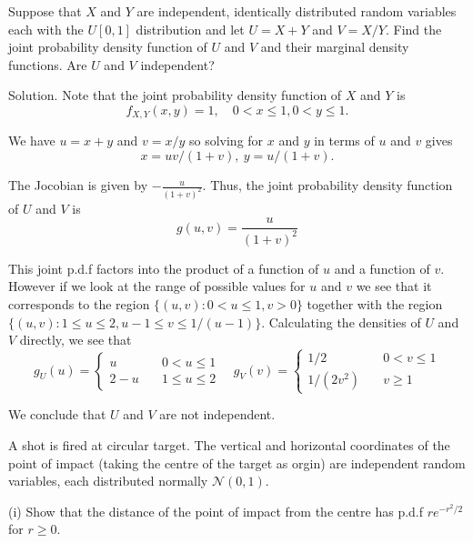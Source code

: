 \item Suppose that $X$ and $Y$ are independent, identically distributed random variables each with the $U[0,1]$ distribution and let $U=X+Y$ and $V=X/Y$. Find the joint probability density function of $U$ and $V$ and their marginal density functions. Are $U$ and $V$ independent?



Solution. Note that the joint probability density function of $X$ and $Y$ is 
\begin{equation}
f_{X,Y}(x,y) = 1,\quad 0<x\leq 1,0<y\leq 1.
\end{equation}

We have $u=x+y$ and $v=x/y$ so solving for $x$ and $y$ in terms of $u$ and $v$ gives 
\begin{equation}
x=uv/(1+v),\ y=u/(1+v). 
\end{equation}

The Jocobian is given by $-\frac{u}{(1+v)^2}$. Thus, the joint probability density function of $U$ and $V$ is 
\begin{equation}
g(u,v) = \frac{u}{(1+v)^2}
\end{equation}

This joint p.d.f factors into the product of a function of $u$ and a function of $v$. However if we look at the range of possible values for $u$ and $v$ we see that it corresponds to the region $\{(u,v):0<u\leq 1,v>0\}$ together with the region $\{(u,v):1\leq u \leq 2, u-1\leq v \leq 1/(u-1)\}$. Calculating the densities of $U$ and $V$ directly, we see that
\begin{equation}
g_U(u) = \left\{\begin{array}{ll}
u & \quad 0<u\leq 1 \\
2-u & \quad 1\leq u\leq 2
\end{array}\right.\quad 
g_V(v) = \left\{\begin{array}{ll}
1/2 & \quad 0<v\leq 1 \\
1/(2v^2) & \quad v\geq 1
\end{array}\right.
\end{equation}

We conclude that $U$ and $V$ are not independent.


\item A shot is fired at circular target. The vertical and horizontal coordinates of the point of impact (taking the centre of the target as orgin) are independent random variables, each distributed normally $\mathcal{N}(0,1)$. 

(i) Show that the distance of the point of impact from the centre has p.d.f $re^{-r^2/2}$ for $r\geq 0$.

